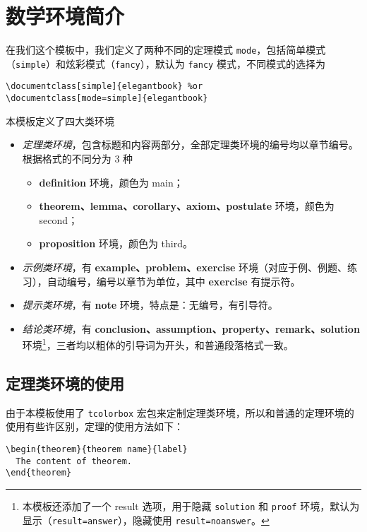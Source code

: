 \section{数学环境简介}

在我们这个模板中，我们定义了两种不同的定理模式 \lstinline{mode}，包括简单模式（\lstinline{simple}）和炫彩模式（\lstinline{fancy}），默认为 \lstinline{fancy} 模式，不同模式的选择为
\begin{lstlisting}
\documentclass[simple]{elegantbook} %or
\documentclass[mode=simple]{elegantbook}
\end{lstlisting}

本模板定义了四大类环境

\begin{itemize}
  \item \textit{定理类环境}，包含标题和内容两部分，全部定理类环境的编号均以章节编号。根据格式的不同分为 3 种
    \begin{itemize}
      \item \textcolor{main}{\textbf{definition}} 环境，颜色为 \textcolor{main}{main}；
      \item \textcolor{second}{\textbf{theorem、lemma、corollary、axiom、postulate}} 环境，颜色为 \textcolor{second} {second}；
      \item \textcolor{third}{\textbf{proposition}} 环境，颜色为 \textcolor{third}{third}。
    \end{itemize}
  \item \textit{示例类环境}，有 \textbf{example、problem、exercise} 环境（对应于例、例题、练习），自动编号，编号以章节为单位，其中 \textbf{exercise} 有提示符。
  \item \textit{提示类环境}，有 \textbf{note} 环境，特点是：无编号，有引导符。
  \item \textit{结论类环境}，有 \textbf{conclusion、assumption、property、remark、solution} 环境\footnote{本模板还添加了一个 result 选项，用于隐藏 \lstinline{solution} 和 \lstinline{proof} 环境，默认为显示（\lstinline{result=answer}），隐藏使用 \lstinline{result=noanswer}。}，三者均以粗体的引导词为开头，和普通段落格式一致。
\end{itemize}

\subsection{定理类环境的使用}

由于本模板使用了 \lstinline{tcolorbox} 宏包来定制定理类环境，所以和普通的定理环境的使用有些许区别，定理的使用方法如下：
\begin{lstlisting}
\begin{theorem}{theorem name}{label}
  The content of theorem.
\end{theorem}
\end{lstlisting}

